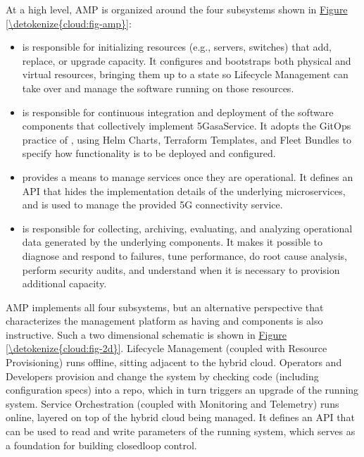 \documentclass[a4paper,11pt,english]{sphinxmanual}
\begin{document}
\sphinxAtStartPar
At a high level, AMP is organized around the four subsystems shown in
\hyperref[\detokenize{cloud:fig-amp}]{Figure \ref{\detokenize{cloud:fig-amp}}}:
\begin{itemize}
\item {} 
\sphinxAtStartPar
{} is responsible for initializing resources
(e.g., servers, switches) that add, replace, or upgrade capacity.
It configures and bootstraps both physical and virtual resources,
bringing them up to a state so Lifecycle Management can take over
and manage the software running on those resources.

\item {} 
\sphinxAtStartPar
{} is responsible for continuous integration
and deployment of the software components that collectively
implement 5G\sphinxhyphen{}as\sphinxhyphen{}a\sphinxhyphen{}Service. It adopts the GitOps practice of
, using Helm Charts, Terraform Templates, and
Fleet Bundles to specify how functionality is to be deployed and
configured.

\item {} 
\sphinxAtStartPar
{} provides a means to manage services once
they are operational. It defines an API that hides the
implementation details of the underlying microservices, and is used
to manage the provided 5G connectivity service.

\item {} 
\sphinxAtStartPar
{} is responsible for collecting, archiving,
evaluating, and analyzing operational data generated by the
underlying components. It makes it possible to diagnose and respond
to failures, tune performance, do root cause analysis, perform
security audits, and understand when it is necessary to provision
additional capacity.

\end{itemize}

\sphinxAtStartPar
AMP implements all four subsystems, but an alternative perspective
that characterizes the management platform as having  and
 components is also instructive. Such a two dimensional
schematic is shown in \hyperref[\detokenize{cloud:fig-2d}]{Figure \ref{\detokenize{cloud:fig-2d}}}. Lifecycle
Management (coupled with Resource Provisioning) runs offline, sitting
adjacent to the hybrid cloud. Operators and Developers provision and
change the system by checking code (including configuration specs)
into a repo, which in turn triggers an upgrade of the running system.
Service Orchestration (coupled with Monitoring and Telemetry) runs
online, layered on top of the hybrid cloud being managed. It defines
an API that can be used to read and write parameters of the running
system, which serves as a foundation for building closed\sphinxhyphen{}loop control.
\end{document}
